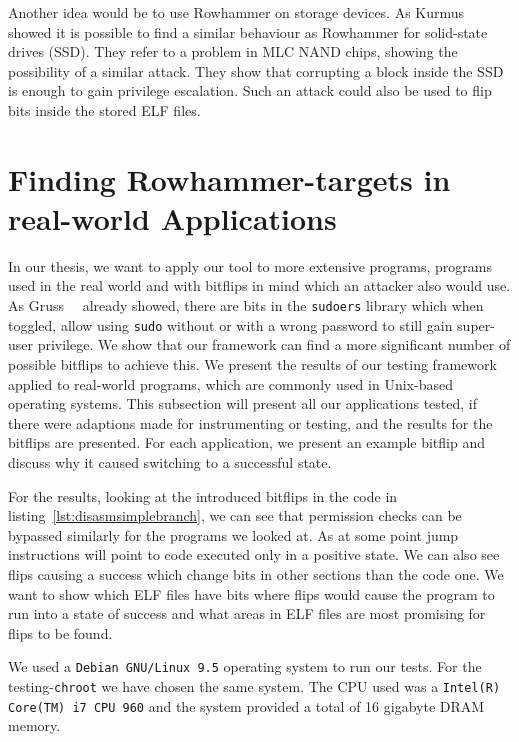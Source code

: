 Another idea would be to use Rowhammer on storage devices. As
Kurmus~\etal~\cite{rowssdhammer} showed it is possible to find a similar
behaviour as Rowhammer for solid-state drives (SSD). They refer to a problem in
MLC NAND chips, showing the possibility of a similar attack. They show that
corrupting a block inside the SSD is enough to gain privilege escalation. Such
an attack could also be used to flip bits inside the stored ELF files.


\chapter{Finding Rowhammer-targets in real-world
Applications}\label{sec:results}

In our thesis, we want to apply our tool to more extensive programs, programs
used in the real world and with bitflips in mind which an attacker also would
use. As Gruss~\etal~\cite{flipinthewall} already showed, there are bits in the
\texttt{sudoers} library which when toggled, allow using \texttt{sudo} without
or with a wrong password to still gain super-user privilege. We show that our
framework can find a more significant number of possible bitflips to achieve
this. We present the results of our testing framework applied to real-world
programs, which are commonly used in Unix-based operating systems. This
subsection will present all our applications tested, if there were adaptions
made for instrumenting or testing, and the results for the bitflips are
presented. For each application, we present an example bitflip and discuss why
it caused switching to a successful state.

For the results, looking at the introduced bitflips in the code in
listing~\ref{lst:disasmsimplebranch}, we can see that permission checks can be
bypassed similarly for the programs we looked at. As at some point jump
instructions will point to code executed only in a positive state. We can also
see flips causing a success which change bits in other sections than the code
one. We want to show which ELF files have bits where flips would cause the
program to run into a state of success and what areas in ELF files are most
promising for flips to be found.

We used a \texttt{Debian GNU/Linux 9.5} operating system to run our tests. For
the testing-\texttt{chroot} we have chosen the same system. The CPU used was a
\texttt{Intel(R) Core(TM) i7 CPU 960} and the system provided a total of 16
gigabyte DRAM memory.

